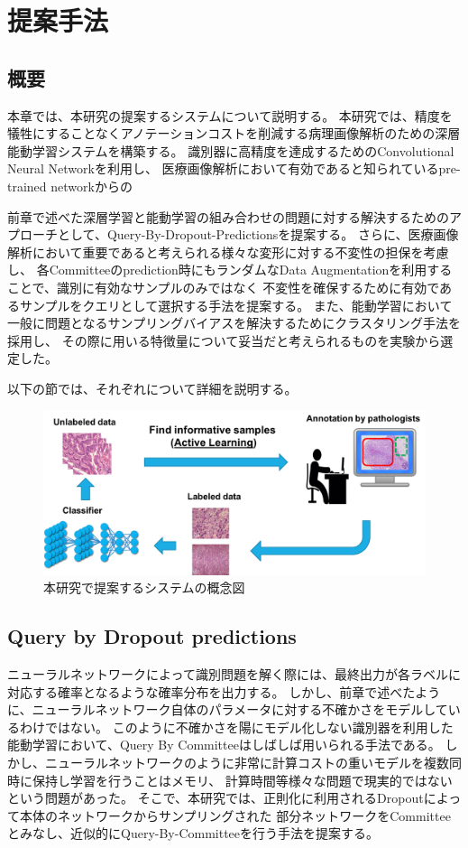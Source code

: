 \chapter{提案手法}

\section{概要}
本章では、本研究の提案するシステムについて説明する。
本研究では、精度を犠牲にすることなくアノテーションコストを削減する病理画像解析のための深層能動学習システムを構築する。
識別器に高精度を達成するためのConvolutional Neural Networkを利用し、
医療画像解析において有効であると知られているpre-trained networkからの

前章で述べた深層学習と能動学習の組み合わせの問題に対する解決するためのアプローチとして、Query-By-Dropout-Predictionsを提案する。
さらに、医療画像解析において重要であると考えられる様々な変形に対する不変性の担保を考慮し、
各Committeeのprediction時にもランダムなData Augmentationを利用することで、識別に有効なサンプルのみではなく
不変性を確保するために有効であるサンプルをクエリとして選択する手法を提案する。
また、能動学習において一般に問題となるサンプリングバイアスを解決するためにクラスタリング手法を採用し、
その際に用いる特徴量について妥当だと考えられるものを実験から選定した。

以下の節では、それぞれについて詳細を説明する。

\begin{figure}[tbp]
    \label{fig:overview}
     \begin{center}
      \includegraphics[width=120mm]{figures/overview.png}
     \end{center}
    \caption{本研究で提案するシステムの概念図}
\end{figure}

\section{Query by Dropout predictions}
ニューラルネットワークによって識別問題を解く際には、最終出力が各ラベルに対応する確率となるような確率分布を出力する。
しかし、前章で述べたように、ニューラルネットワーク自体のパラメータに対する不確かさをモデルしているわけではない。
このように不確かさを陽にモデル化しない識別器を利用した能動学習において、Query By Committeeはしばしば用いられる手法である。
しかし、ニューラルネットワークのように非常に計算コストの重いモデルを複数同時に保持し学習を行うことはメモリ、
計算時間等様々な問題で現実的ではないという問題があった。
そこで、本研究では、正則化に利用されるDropoutによって本体のネットワークからサンプリングされた
部分ネットワークをCommitteeとみなし、近似的にQuery-By-Committeeを行う手法を提案する。

